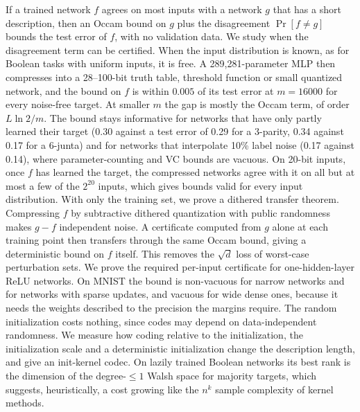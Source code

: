 If a trained network $f$ agrees on most inputs with a network $g$ that has a short description, then an Occam bound on $g$ plus the disagreement $\Pr[f\ne g]$ bounds the test error of $f$, with no validation data. We study when the disagreement term can be certified. When the input distribution is known, as for Boolean tasks with uniform inputs, it is free. A 289{,}281-parameter MLP then compresses into a 28--100-bit truth table, threshold function or small quantized network, and the bound on $f$ is within $0.005$ of its test error at $m=16000$ for every noise-free target. At smaller $m$ the gap is mostly the Occam term, of order $L\ln2/m$. The bound stays informative for networks that have only partly learned their target (0.30 against a test error of 0.29 for a 3-parity, 0.34 against 0.17 for a 6-junta) and for networks that interpolate 10\% label noise (0.17 against 0.14), where parameter-counting and VC bounds are vacuous. On 20-bit inputs, once $f$ has learned the target, the compressed networks agree with it on all but at most a few of the $2^{20}$ inputs, which gives bounds valid for every input distribution. With only the training set, we prove a dithered transfer theorem. Compressing $f$ by subtractive dithered quantization with public randomness makes $g-f$ independent noise. A certificate computed from $g$ alone at each training point then transfers through the same Occam bound, giving a deterministic bound on $f$ itself. This removes the $\sqrt{d}$ loss of worst-case perturbation sets. We prove the required per-input certificate for one-hidden-layer ReLU networks. On MNIST the bound is non-vacuous for narrow networks and for networks with sparse updates, and vacuous for wide dense ones, because it needs the weights described to the precision the margins require. The random initialization costs nothing, since codes may depend on data-independent randomness. We measure how coding relative to the initialization, the initialization scale and a deterministic initialization change the description length, and give an init-kernel codec. On lazily trained Boolean networks its best rank is the dimension of the degree-$\le1$ Walsh space for majority targets, which suggests, heuristically, a cost growing like the $n^k$ sample complexity of kernel methods.
